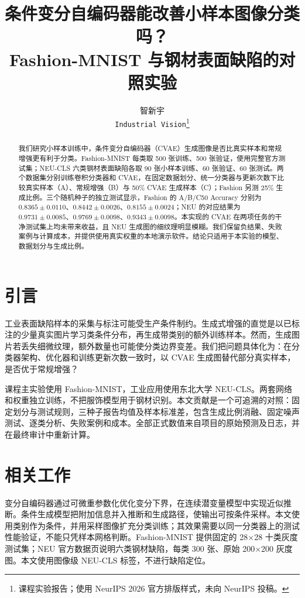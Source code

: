 \documentclass{article}
\title{条件变分自编码器能改善小样本图像分类吗？\\Fashion-MNIST 与钢材表面缺陷的对照实验}
\author{智新宇\\\texttt{Industrial Vision}\thanks{课程实验报告；使用 NeurIPS 2026 官方排版样式，未向 NeurIPS 投稿。}}
\begin{document}
\maketitle

\begin{abstract}
我们研究小样本训练中，条件变分自编码器（CVAE）生成图像是否比真实样本和常规增强更有利于分类。Fashion-MNIST 每类取 500 张训练、500 张验证，使用完整官方测试集；NEU-CLS 六类钢材表面缺陷各取 90 张小样本训练、60 张验证、60 张测试。两个数据集分别训练卷积分类器和 CVAE，在固定数据划分、统一分类器与更新次数下比较真实样本（A）、常规增强（B）与 50\% CVAE 生成样本（C）；Fashion 另测 25\% 生成比例。三个随机种子的独立测试显示，Fashion 的 A/B/C50 Accuracy 分别为 $0.8365\pm0.0110$、$0.8442\pm0.0026$、$0.8155\pm0.0024$；NEU 的对应结果为 $0.9731\pm0.0085$、$0.9769\pm0.0098$、$0.9343\pm0.0098$。本实现的 CVAE 在两项任务的干净测试集上均未带来收益，且 NEU 生成图的细纹理明显模糊。我们保留负结果、失败案例与计算成本，并提供使用真实权重的本地演示软件。结论只适用于本实验的模型、数据划分与生成比例。
\end{abstract}

\section{引言}
工业表面缺陷样本的采集与标注可能受生产条件制约。生成式增强的直觉是以已标注的少量真实图片学习类条件分布，再生成带类别的额外训练样本。然而，生成图片若丢失细微纹理，额外数量也可能使分类边界变差。我们把问题具体化为：在分类器架构、优化器和训练更新次数一致时，以 CVAE 生成图替代部分真实样本，是否优于常规增强？

课程主实验使用 Fashion-MNIST\cite{fashionmnist}，工业应用使用东北大学 NEU-CLS\cite{neusource}。两套网络和权重独立训练，不把服饰模型用于钢材识别。本文贡献是一个可追溯的对照：固定划分与测试规则，三种子报告均值及样本标准差，包含生成比例消融、固定噪声测试、逐类分析、失败案例和成本。全部正式数值来自项目的原始预测及日志，并在最终审计中重新计算。

\section{相关工作}
变分自编码器通过可微重参数化优化变分下界，在连续潜变量模型中实现近似推断\cite{kingma2014}。条件生成模型把附加信息并入推断和生成路径，使输出可按条件采样\cite{sohn2015}。本文使用类别作为条件，并用采样图像扩充分类训练；其效果需要以同一分类器上的测试性能验证，不能只凭样本网格判断。Fashion-MNIST 提供固定的 28$\times$28 十类灰度测试集\cite{fashionmnist}；NEU 官方数据页说明六类钢材缺陷，每类 300 张、原始 200$\times$200 灰度图\cite{neusource}。本文使用图像级 NEU-CLS 标签，不进行缺陷定位。
\end{document}

